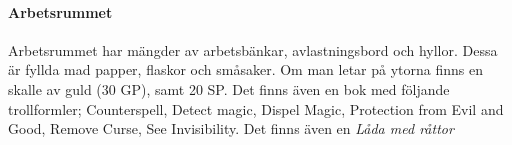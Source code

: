 \paragraph{Arbetsrummet}
Arbetsrummet har mängder av arbetsbänkar, avlastningsbord och hyllor. Dessa är fyllda mad papper, flaskor och småsaker. Om man letar på ytorna finns en skalle av guld (30 GP), samt 20 SP. Det finns även en bok med följande trollformler; Counterspell, Detect magic, Dispel Magic, Protection from Evil and Good, Remove Curse, See Invisibility. Det finns även en \textit{Låda med råttor} \sectiondescribe{\ref{ladaMedRattor}}